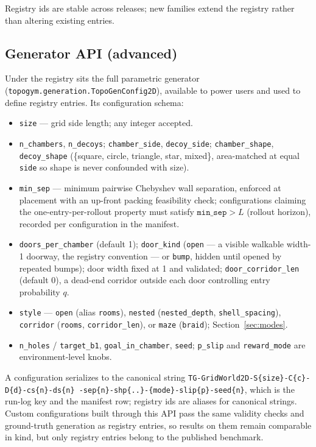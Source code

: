 \documentclass[11pt]{article}
\begin{document}
Registry ids are stable across releases; new families extend the
registry rather than altering existing entries.

\subsection{Generator API (advanced)}
\label{sec:generator}

Under the registry sits the full parametric generator
(\texttt{topogym.generation.TopoGenConfig2D}), available to power
users and used to define registry entries. Its configuration schema:
\begin{itemize}[leftmargin=2em, itemsep=1pt]
  \item \texttt{size} --- grid side length; any integer accepted.
  \item \texttt{n\_chambers}, \texttt{n\_decoys};
        \texttt{chamber\_side}, \texttt{decoy\_side};
        \texttt{chamber\_shape}, \texttt{decoy\_shape}
        (\{square, circle, triangle, star, mixed\}, area-matched at
        equal \texttt{side} so shape is never confounded with size).
  \item \texttt{min\_sep} --- minimum pairwise Chebyshev wall
        separation, enforced at placement with an up-front packing
        feasibility check; configurations claiming the
        one-entry-per-rollout property must satisfy
        $\texttt{min\_sep} > L$ (rollout horizon), recorded per
        configuration in the manifest.
  \item \texttt{doors\_per\_chamber} (default 1);
        \texttt{door\_kind} (\texttt{open} --- a visible walkable
        width-1 doorway, the registry convention --- or \texttt{bump},
        hidden until opened by repeated bumps); door width fixed at 1
        and validated; \texttt{door\_corridor\_len} (default 0), a
        dead-end corridor outside each door controlling entry
        probability $q$.
  \item \texttt{style} --- \texttt{open} (alias \texttt{rooms}),
        \texttt{nested} (\texttt{nested\_depth},
        \texttt{shell\_spacing}), \texttt{corridor} (\texttt{rooms},
        \texttt{corridor\_len}), or \texttt{maze} (\texttt{braid});
        Section~\ref{sec:modes}.
  \item \texttt{n\_holes} / \texttt{target\_b1},
        \texttt{goal\_in\_chamber}, \texttt{seed}; \texttt{p\_slip}
        and \texttt{reward\_mode} are environment-level knobs.
\end{itemize}
A configuration serializes to the canonical string
\texttt{TG-GridWorld2D-S\{size\}-C\{c\}-D\{d\}-cs\{n\}-ds\{n\}%
-sep\{n\}-shp\{..\}-\{mode\}-slip\{p\}-seed\{n\}}, which is the
run-log key and the manifest row; registry ids are aliases for
canonical strings. Custom configurations built through this API pass
the same validity checks and ground-truth generation as registry
entries, so results on them remain comparable in kind, but only
registry entries belong to the published benchmark.
\end{document}
